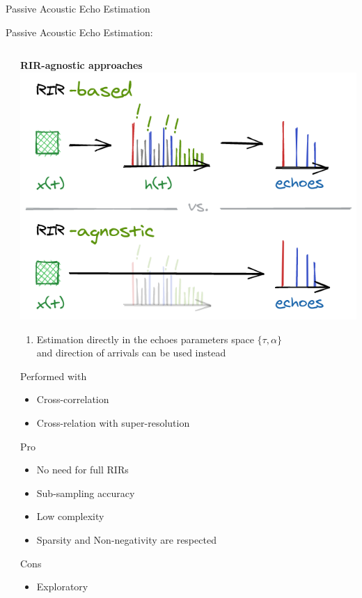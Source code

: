 \begin{frame}{Passive Acoustic Echo Estimation}
\begin{block}{\alert{Passive} Acoustic Echo Estimation:}
\begin{columns}[T,onlytextwidth]
\begin{column}{.48\textwidth}
\begin{itemize}
                \end{itemize}
            \end{column}%
            \hfill%
            \begin{column}{.48\textwidth}
                \textbf{RIR-\alert{agnostic} approaches}
                \includegraphics[trim={0 0 0 47em},clip,width=.9\textwidth]{./figures/based-agnostic.png}
                \begin{enumerate}
                    \item Estimation directly in the echoes parameters space $\{\tau,\alpha\}$
                    \\and direction of arrivals can be used instead
                \end{enumerate}
                Performed with
                \begin{itemize}
                    \item Cross-correlation %
                    \item Cross-relation with super-resolution %
                \end{itemize}
                Pro
                \begin{itemize}
                    \item No need for full RIRs
                    \item Sub-sampling accuracy
                    \item Low complexity
                    \item Sparsity and Non-negativity are respected
                \end{itemize}
                Cons
                \begin{itemize}
                    \item Exploratory
                \end{itemize}
            \end{column}%
        \end{columns}


\end{block}
\end{frame}
